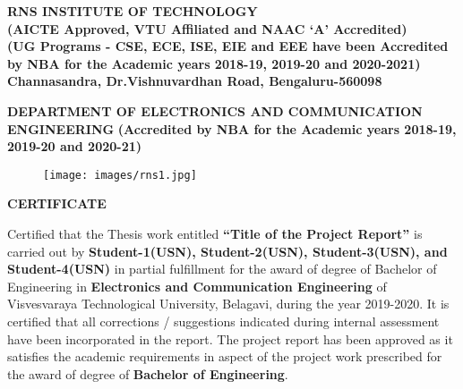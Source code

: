 \setlength{\toptafiddle}{1in}
\setlength{\bottafiddle}{1in}
\vspace*{-0.5in}
\enlargethispage{\bottafiddle}
\thispagestyle{empty}


\begin{center}
	\large\textbf{RNS INSTITUTE OF TECHNOLOGY}\\
	\small\textbf{(AICTE Approved, VTU Affiliated and NAAC `A' Accredited)\\
		(UG Programs - CSE, ECE, ISE, EIE and EEE have been Accredited by NBA for the Academic years 2018-19, 2019-20 and 2020-2021)\\
		Channasandra, Dr.Vishnuvardhan Road, Bengaluru-560098}\\
\end{center}
\begin{center}
	\footnotesize\textbf{DEPARTMENT OF ELECTRONICS AND COMMUNICATION ENGINEERING}
	\small\textbf{(Accredited by NBA for the Academic years 2018-19, 2019-20 and 2020-21)}	
\end{center}

\begin{center}
\begin{figure}[h]
\centering
\texttt{[image: images/rns1.jpg]}
\end{figure}
\Large{\textbf{CERTIFICATE}}
\end{center}

Certified that the Thesis work entitled \textbf{``Title of the Project Report''} is carried out by \textbf{Student-1(USN), Student-2(USN), Student-3(USN), and Student-4(USN)} in partial fulfillment for the award of degree of Bachelor of Engineering in \textbf{\color{blue}Electronics and Communication Engineering} of Visvesvaraya Technological University, Belagavi, during the year 2019-2020. It is certified that all corrections / suggestions indicated during internal assessment have been incorporated in the report. The project report has been approved as it satisfies the academic requirements in aspect of the project work prescribed for the award of degree of \textbf{\color{blue}Bachelor of Engineering}.


